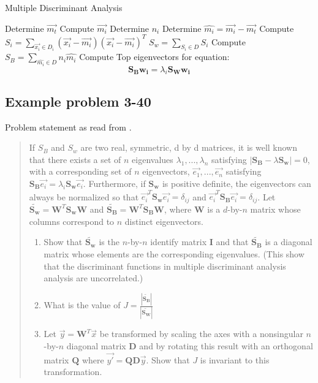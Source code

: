 \documentclass[11pt]{article}
\begin{document}
\begin{algorithm}
\caption{Multiple Discriminant Analysis}
\label{alg:multiple_discriminant_analysis}
\begin{algorithmic}
	\STATE Determine $\vec{m_t}$
		\STATE Compute $\vec{m_i}$
		\STATE Determine $n_i$
		\STATE Determine $\hat{m_i} = \vec{m_i} - \vec{m_t}$
		\STATE Compute $S_i = \sum_{\vec{x_i} \in D_i} (\vec{x_i} - \vec{m_i} )(\vec{x_i} - \vec{m_i} )^T $
	\ENDFOR
	\STATE $S_w = \sum _{S_i \in D} S_i$
	\STATE Compute $S_B = \sum_{\hat{m_i} \in D} n_i \hat{m_i}$
	\STATE Compute Top eigenvectors for equation: 
	\[
	\mathbf{S_B} \mathbf{w_i} = \lambda_i \mathbf{S_W} \mathbf{w_i}
	\]
\end{algorithmic}
\end{algorithm}

\subsection{Example problem 3-40 \cite[152]{duda-hart-stork}}
Problem statement as read from \cite[152]{duda-hart-stork}.
\begin{quote}
If $S_B$ and $S_w$ are two real, symmetric, d by d matrices, it is well known that there exists a set of $n$ eigenvalues $\lambda_1, ..., \lambda_n$ satisfying $| \mathbf{S_B} - \lambda \mathbf{S_w}| = 0$, with a corresponding set of $n$ eigenvectors, $\vec{e_1},...,\vec{e_n} $ satisfying $\mathbf{S_B}\vec{e_i} = \lambda_i \mathbf{S_w}\vec{e_i}$.  Furthermore, if $\mathbf{S_w}$ is positive definite, the eigenvectors can always be normalized so that $\vec{e_i}^T \mathbf{S_w} \vec{e_i} = \delta_{ij}$ and $\vec{e_i}^T \mathbf{S_B} \vec{e_i} = \delta_{ij}$.  Let $\tilde{\mathbf{S_w}} = \mathbf{W}^T \mathbf{S_w} \mathbf{W}$ and $\tilde{\mathbf{S_B}} =  \mathbf{W}^T \mathbf{S_B} \mathbf{W}$, where $\mathbf{W}$ is a $d$-by-$n$ matrix whose columns correspond to $n$ distinct eigenvectors.  
\begin{enumerate}
	\item Show that $\tilde{\mathbf{S_w}}$ is the $n$-by-$n$ identify matrix $\mathbf{I}$ and that $\tilde{\mathbf{S_B}}$ is a diagonal matrix whose elements are the corresponding eigenvalues.  (This show that the discriminant functions in multiple discriminant analysis analysis are uncorrelated.)
	\item What is the value of $J = \frac{|\mathbf{\tilde{S_B}} |}{|\mathbf{\tilde{S_W}} |}$
	\item Let $\vec{y} = \mathbf{W}^T \vec{x}$ be transformed by scaling the axes with a nonsingular $n$-by-$n$ diagonal matrix $\mathbf{D}$ and by rotating this result with an orthogonal matrix $\mathbf{Q}$ where $\vec{y'} = \mathbf{QD}\vec{y}$.  Show that $J$ is invariant to this transformation.  
\end{enumerate}

\end{quote}
\end{document}
